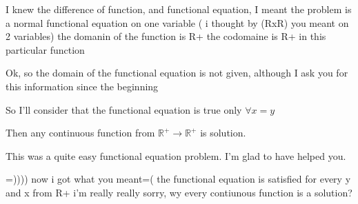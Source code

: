 \begin{solution}
	\begin{tcolorbox}I knew the difference of function, and functional equation, I meant the problem is a normal functional equation on one variable ( i thought by (RxR) you meant on 2 variables)
the domanin of the function is R+
the codomaine is R+ in this particular function\end{tcolorbox}
Ok, so the domain of the functional equation is not given, although I ask you for this information since the beginning

So I'll consider that the functional equation is true only $\forall x=y$

Then any continuous function from $\mathbb R^+\to\mathbb R^+$ is solution.

This was a quite easy functional equation problem.
I'm glad to have helped you.
\end{solution}



\begin{solution}
	=)))) now i got what you meant=( the functional equation is satisfied for every y and x from R+ i'm really  really sorry, wy every contiunous function is a solution?
\end{solution}



